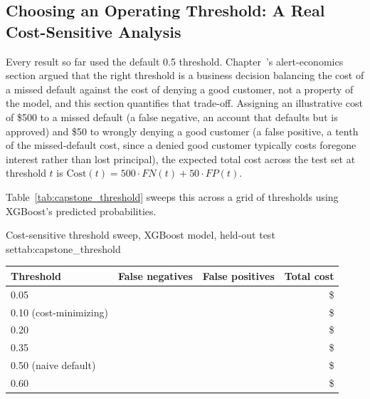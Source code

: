\documentclass[../ai_in_finance]{subfiles}
\begin{document}
\subsection{Choosing an Operating Threshold: A Real Cost-Sensitive Analysis}
\label{sec:capstone-threshold}

Every result so far used the default 0.5 threshold. Chapter~'s alert-economics section argued that the right threshold is a business decision balancing the cost of a missed default against the cost of denying a good customer, not a property of the model, and this section quantifies that trade-off. Assigning an illustrative cost of \$500 to a missed default (a false negative, an account that defaults but is approved) and \$50 to wrongly denying a good customer (a false positive, a tenth of the missed-default cost, since a denied good customer typically costs foregone interest rather than lost principal), the expected total cost across the test set at threshold $t$ is $\text{Cost}(t) = 500 \cdot FN(t) + 50 \cdot FP(t)$.

Table~\ref{tab:capstone_threshold} sweeps this across a grid of thresholds using XGBoost's predicted probabilities.

\begin{booktable}[htbp]{Cost-sensitive threshold sweep, XGBoost model, held-out test set}{tab:capstone_threshold}
\begin{tabular}{lrrr}
\toprule
Threshold & False negatives & False positives & Total cost \\
\midrule
0.05 & \vChTwentyOneCostAFN{} & \vChTwentyOneCostAFP{} & \$\vChTwentyOneCostATotal{} \\
0.10 (cost-minimizing) & \vChTwentyOneCostBFN{} & \vChTwentyOneCostBFP{} & \$\vChTwentyOneCostBTotal{} \\
0.20 & \vChTwentyOneCostCFN{} & \vChTwentyOneCostCFP{} & \$\vChTwentyOneCostCTotal{} \\
0.35 & \vChTwentyOneCostDFN{} & \vChTwentyOneCostDFP{} & \$\vChTwentyOneCostDTotal{} \\
0.50 (naive default) & \vChTwentyOneCostEFN{} & \vChTwentyOneCostEFP{} & \$\vChTwentyOneCostETotal{} \\
0.60 & \vChTwentyOneCostFFN{} & \vChTwentyOneCostFFP{} & \$\vChTwentyOneCostFTotal{} \\
\bottomrule
\end{tabular}
\end{booktable}
\end{document}
